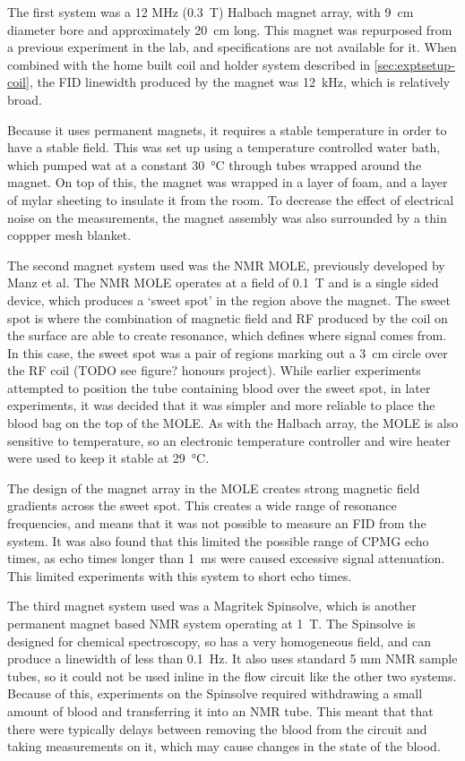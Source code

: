 The first system was a 12 MHz (\SI{0.3}{T}) Halbach magnet array, with \SI{9}{cm} diameter bore and approximately \SI{20}{\centi\metre} long.
This magnet was repurposed from a previous experiment in the lab, and specifications are not available for it.
When combined with the home built coil and holder system described in \autoref{sec:exptsetup-coil}, the FID linewidth produced by the magnet was \SI{12}{\kilo\hertz}, which is relatively broad.

Because it uses permanent magnets, it requires a stable temperature in order to have a stable field.
This was set up using a temperature controlled water bath, which pumped wat at a constant \SI{30}{\celsius} through tubes wrapped around the magnet.
On top of this, the magnet was wrapped in a layer of foam, and a layer of mylar sheeting to insulate it from the room.
To decrease the effect of electrical noise on the measurements, the magnet assembly was also surrounded by a thin coppper mesh blanket.

The second magnet system used was the NMR MOLE, previously developed by Manz et al\cite{ManzmobileonesidedNMR2006}.
The NMR MOLE operates at a field of \SI{0.1}{T} and is a single sided device, which produces a `sweet spot' in the region above the magnet.
The sweet spot is where the combination of magnetic field and RF produced by the coil on the surface are able to create resonance, which defines where signal comes from.
In this case, the sweet spot was a pair of regions marking out a \SI{3}{cm} circle over the RF coil (TODO see figure? honours project).
While earlier experiments attempted to position the tube containing blood over the sweet spot, in later experiments, it was decided that it was simpler and more reliable to place the blood bag on the top of the MOLE.
As with the Halbach array, the MOLE is also sensitive to temperature, so an electronic temperature controller and wire heater were used to keep it stable at \SI{29}{\celsius}.

The design of the magnet array in the MOLE creates strong magnetic field gradients across the sweet spot.
This creates a wide range of resonance frequencies, and means that it was not possible to measure an FID from the system.
It was also found that this limited the possible range of CPMG echo times, as echo times longer than \SI{1}{ms} were caused excessive signal attenuation.
This limited experiments with this system to short echo times.

The third magnet system used was a Magritek Spinsolve, which is another permanent magnet based NMR system operating at \SI{1}{T}.
The Spinsolve is designed for chemical spectroscopy, so has a very homogeneous field, and can produce a linewidth of less than \SI{0.1}{Hz}.
It also uses standard 5 mm NMR sample tubes, so it could not be used inline in the flow circuit like the other two systems.
Because of this, experiments on the Spinsolve required withdrawing a small amount of blood and transferring it into an NMR tube.
This meant that that there were typically delays between removing the blood from the circuit and taking measurements on it, which may cause changes in the state of the blood.

